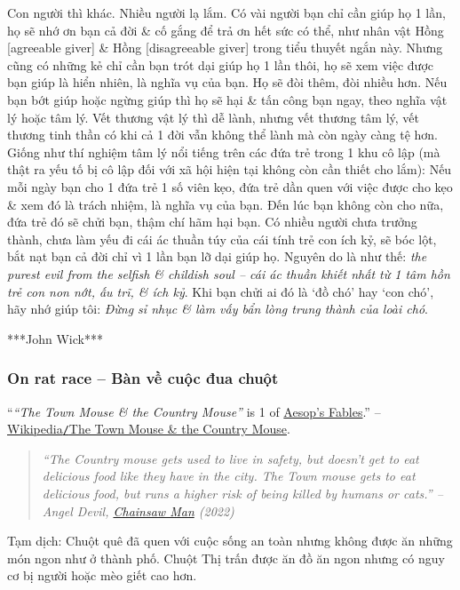 \documentclass[12pt]{article}
\begin{document}
Con người thì khác. Nhiều người lạ lắm. Có vài người bạn chỉ cần giúp họ 1 lần, họ sẽ nhớ ơn bạn cả đời \& cố gắng để trả ơn hết sức có thể, như nhân vật {\sf Hồng [agreeable giver]} \& {\sf Hồng [disagreeable giver]} trong tiểu thuyết ngắn này. Nhưng cũng có những kẻ chỉ cần bạn trót dại giúp họ 1 lần thôi, họ sẽ xem việc được bạn giúp là hiển nhiên, là nghĩa vụ của bạn. Họ sẽ đòi thêm, đòi nhiều hơn. Nếu bạn bớt giúp hoặc ngừng giúp thì họ sẽ hại \& tấn công bạn ngay, theo nghĩa vật lý hoặc tâm lý. Vết thương vật lý thì dễ lành, nhưng vết thương tâm lý, vết thương tinh thần có khi cả 1 đời vẫn không thể lành mà còn ngày càng tệ hơn. Giống như thí nghiệm tâm lý nổi tiếng trên các đứa trẻ trong 1 khu cô lập (mà thật ra yếu tố bị cô lập đối với xã hội hiện tại không còn cần thiết cho lắm): Nếu mỗi ngày bạn cho 1 đứa trẻ 1 số viên kẹo, đứa trẻ dần quen với việc được cho kẹo \& xem đó là trách nhiệm, là nghĩa vụ của bạn. Đến lúc bạn không còn cho nữa, đứa trẻ đó sẽ chửi bạn, thậm chí hãm hại bạn. Có nhiều người chưa trưởng thành, chưa làm yếu đi cái ác thuần túy của cái tính trẻ con ích kỷ, sẽ bóc lột, bắt nạt bạn cả đời chỉ vì 1 lần bạn lỡ dại giúp họ. Nguyên do là như thế: {\it the purest evil from the selfish \& childish soul -- cái ác thuần khiết nhất từ 1 tâm hồn trẻ con non nớt, ấu trĩ, \& ích kỷ}. Khi bạn chửi ai đó là `đồ chó' hay `con chó', hãy nhớ giúp tôi: {\it Đừng sỉ nhục \& làm vấy bẩn lòng trung thành của loài chó}.

***John Wick***

\subsubsection{On rat race -- Bàn về cuộc đua chuột}

``{\it``The Town Mouse \& the Country Mouse''} is 1 of \href{https://en.wikipedia.org/wiki/Aesop%27s_Fables}{Aesop's Fables}.'' -- \href{https://en.wikipedia.org/wiki/The_Town_Mouse_and_the_Country_Mouse}{Wikipedia{\tt/}The Town Mouse \& the Country Mouse}.

\begin{quotation}\it
	``The Country mouse gets used to live in safety, but doesn't get to eat delicious food like they have in the city. The Town mouse gets to eat delicious food, but runs a higher risk of being killed by humans or cats.'' -- {\sc Angel Devil}, \href{https://www.imdb.com/title/tt13616990/}{Chainsaw Man} (2022)
\end{quotation}
{\sf Tạm dịch}: Chuột quê đã quen với cuộc sống an toàn nhưng không được ăn những món ngon như ở thành phố. Chuột Thị trấn được ăn đồ ăn ngon nhưng có nguy cơ bị người hoặc mèo giết cao hơn.
\end{document}
